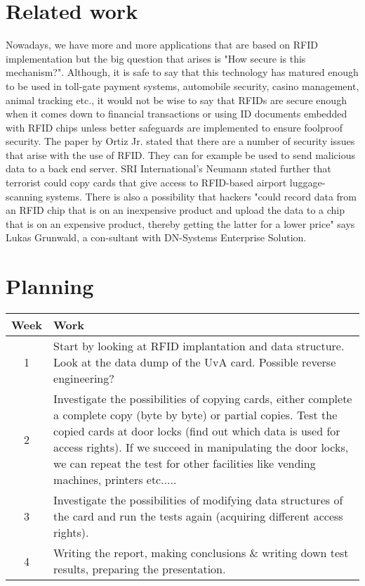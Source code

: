 \documentclass[11pt]{article}
\begin{document}
\section{Related work}
Nowadays, we have more and more applications that are based on RFID implementation but the big question that arises is "How secure is this mechanism?". Although, it is safe to say that this technology has matured enough to be used in toll-gate payment systems, automobile security, casino management, animal tracking etc., it would not be wise to say that RFIDs are secure enough when it comes down to financial transactions or using ID documents embedded with RFID chips unless better safeguards are implemented to ensure foolproof security. \cite{grover2011survey}
\newline
\newline
The paper by Ortiz Jr. stated that there are a number of security issues that arise with the use of RFID. They can for example be used to send malicious data to a back end server. SRI International’s Neumann stated further that terrorist could copy cards that give access to RFID-based airport luggage-scanning systems. There is also a possibility that hackers "could record data from an RFID chip that is on an inexpensive product and upload the data to a chip that is on an expensive product, thereby getting the latter for a lower price" says Lukas Grunwald, a con-sultant with DN-Systems Enterprise Solution. \cite{ortiz2006secure}

\section{Planning}

\begin{center}
\begin{tabular}{ | c | m{11cm}|  } 
\hline
Week & Work \\ 
\hline
1 & Start by looking at RFID implantation and data structure. Look at the data dump of the UvA card. Possible reverse engineering?  \\ 
\hline
2 & Investigate the possibilities of copying cards, either complete a complete copy (byte by byte) or partial copies. Test the copied cards at door locks (find out which data is used for access rights). If we succeed in manipulating the door locks, we can repeat the test for other facilities like vending machines, printers etc.....  \\ 
\hline
3 & Investigate the possibilities of modifying data structures of the card and run the tests again (acquiring different access rights). \\ 
\hline
4 & Writing the report, making conclusions \& writing down test results, preparing the presentation. \\
\hline
\end{tabular}
\end{center}
\end{document}
